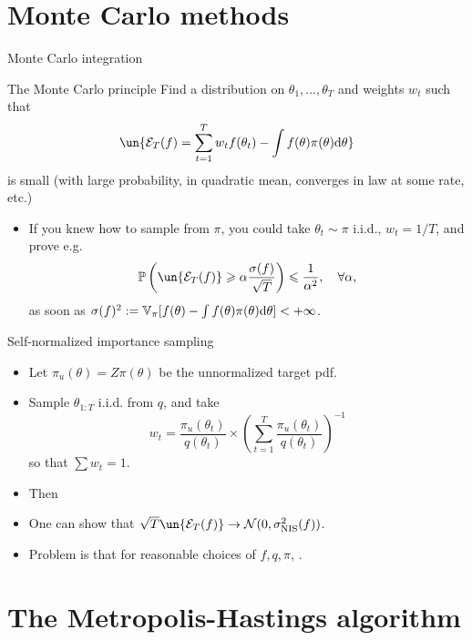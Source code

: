 \documentclass[10pt]{beamer}
\begin{document}
\section{Monte Carlo methods}
\begin{frame}{Monte Carlo integration}
\begin{block}{The Monte Carlo principle}
Find a distribution on $\theta_1,\dots,\theta_T$ and weights $w_t$ such that
$$ \un{\mathcal{E}_T(f) =  \sum_{t=1}^T w_t f(\theta_t) - \int f(\theta)\pi(\theta)\d \theta}$$
is small (with large probability, in quadratic mean, converges in law at some rate, etc.)
\end{block}
\begin{itemize}
  \item If you knew how to sample from $\pi$, you could take $\theta_t\sim\pi$ i.i.d., $w_t=1/T$, and prove e.g.
  $$ \mathbb{P}\left( \un{\mathcal{E}_T(f)} \geq \alpha\frac{\sigma(f)}{\sqrt{T}} \right) \leq \frac{1}{\alpha^2}, \quad \forall \alpha,$$
  as soon as $\sigma(f)^2 := \mathbb{V}_\pi [f(\theta) - \int f(\theta)\pi(\theta){\rm d}\theta]<+\infty$.
\end{itemize}
\end{frame}

\begin{frame}{Self-normalized importance sampling}
\begin{itemize}
  \item Let $\pi_u(\theta) = Z\pi(\theta)$ be the unnormalized target pdf.
  \item Sample $\theta_{1:T}$ i.i.d. from $q$, and take
  $$
  w_t = \frac{\pi_u(\theta_t)}{q(\theta_t)} \times \left( \sum_{t=1}^T \frac{\pi_u(\theta_t)}{q(\theta_t)} \right)^{-1}
  $$
  so that $\sum w_t = 1$.
  \item Then
  \vspace{2cm}
  \item One can show that $ \sqrt{T}\un{\mathcal{E}_T(f)} \rightarrow \cN(0, \sigma^2_{\text{NIS}}(f))$.
  \item Problem is that for reasonable choices of $f,q,\pi$, .
\end{itemize}
\vfill
\end{frame}

\section{The Metropolis-Hastings algorithm}
\end{document}
